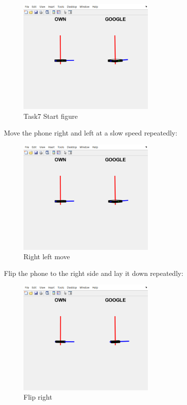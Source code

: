 \begin{figure}[H]
 \centering
 \includegraphics[width=0.6\textwidth]{images/7start.png}
 \caption{Task7 Start figure}
 \label{7start}
\end{figure}

Move the phone right and left at a slow speed repeatedly:

\begin{figure}[H]
 \centering
 \includegraphics[width=0.6\textwidth]{images/rightleft.png}
 \caption{Right left move }
 \label{rightleft}
\end{figure}

Flip the phone to the right side and lay it down repeatedly:
\begin{figure}[H]
 \centering
 \includegraphics[width=0.6\textwidth]{images/flipright.png}
 \caption{Flip right}
 \label{flipright}
\end{figure}

